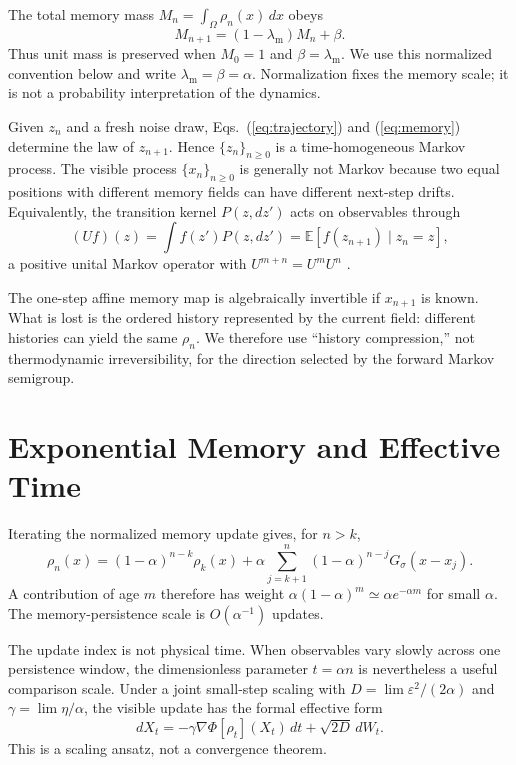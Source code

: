 \documentclass[reprint,amsmath,amssymb,aps,prd,nofootinbib,floatfix]{revtex4-2}
\begin{document}
The total memory mass $M_n=\int_\Omega\rho_n(x)\,dx$ obeys
\begin{equation}
M_{n+1}=(1-\lambda_{\mathrm m})M_n+\beta .
\end{equation}
Thus unit mass is preserved when $M_0=1$ and
$\beta=\lambda_{\mathrm m}$.
We use this normalized convention below and write
$\lambda_{\mathrm m}=\beta=\alpha$.
Normalization fixes the memory scale; it is not a probability interpretation
of the dynamics.

Given $z_n$ and a fresh noise draw, Eqs.~(\ref{eq:trajectory}) and
(\ref{eq:memory}) determine the law of $z_{n+1}$.
Hence $\{z_n\}_{n\geq0}$ is a time-homogeneous Markov process.
The visible process $\{x_n\}_{n\geq0}$ is generally not Markov because two
equal positions with different memory fields can have different next-step
drifts.
Equivalently, the transition kernel $P(z,dz')$ acts on observables through
\begin{equation}
(Uf)(z)=\int f(z')P(z,dz')
=\mathbb{E}[f(z_{n+1})\mid z_n=z],
\end{equation}
a positive unital Markov operator with $U^{m+n}=U^mU^n$
\cite{WilliamsKevrekidisRowley2015,KlusEtAl2018}.

The one-step affine memory map is algebraically invertible if $x_{n+1}$ is
known.
What is lost is the ordered history represented by the current field:
different histories can yield the same $\rho_n$.
We therefore use ``history compression,'' not thermodynamic irreversibility,
for the direction selected by the forward Markov semigroup.

\section{Exponential Memory and Effective Time}

Iterating the normalized memory update gives, for $n>k$,
\begin{equation}
\rho_n(x)=(1-\alpha)^{n-k}\rho_k(x)
+\alpha\sum_{j=k+1}^n(1-\alpha)^{n-j}
G_\sigma(x-x_j).
\label{eq:memory_sum}
\end{equation}
A contribution of age $m$ therefore has weight
$\alpha(1-\alpha)^m\simeq\alpha e^{-\alpha m}$ for small $\alpha$.
The memory-persistence scale is $O(\alpha^{-1})$ updates.

The update index is not physical time.
When observables vary slowly across one persistence window, the dimensionless
parameter $t=\alpha n$ is nevertheless a useful comparison scale.
Under a joint small-step scaling with
$D=\lim\varepsilon^2/(2\alpha)$ and
$\gamma=\lim\eta/\alpha$, the visible update has the formal effective form
\begin{equation}
dX_t=-\gamma\nabla\Phi[\rho_t](X_t)\,dt+\sqrt{2D}\,dW_t .
\label{eq:sde}
\end{equation}
This is a scaling ansatz, not a convergence theorem.
\end{document}
